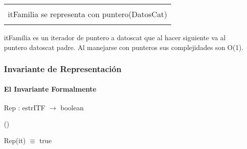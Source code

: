 \begin{center}
\begin{tabular}{|l|} 
\hline
\\
itFamilia se representa con puntero(DatosCat)\\
\\
\hline
\end{tabular}
\end{center}

\par itFamilia es un iterador de puntero a datoscat que al hacer siguiente va al puntero datoscat padre. Al manejarse con punteros sus complejidades son O(1).

\subsubsection{Invariante de Representaci\'on}

\paragraph{El Invariante Formalmente}
{\begin{changemargin}{0em}{4em}Rep : estrITF $\rightarrow$ boolean\par \end{changemargin}(\paratodo{})} Rep(it) $\equiv$ true

